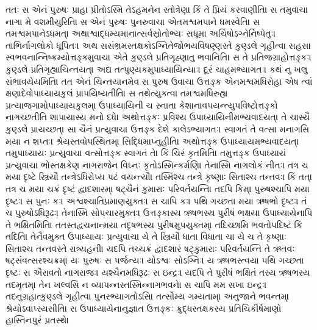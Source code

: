 \documentclass[a4paper,12pt]{article}
\begin{document}
તતઃ સ એનં પુરુષઃ પ્રાહ। પ્રીતોઽસ્મિ તેઽહમનેન સ્તોત્રેણ। કિં તે પ્રિયં કરવાણીતિ।
સ તમુવાચ। નાગા મે વશમીયુરિતિ।
સ એનં પુરુષઃ પુનરુવાચ। એતમશ્વમપાને ધમસ્વેતિ।
સ તમશ્વમપાનેઽધમત્। અથાશ્વાદ્ધમ્યમાનાત્સર્વસ્રોતોભ્યઃ સધૂમા અર્ચિષોઽગ્નેર્નિષ્પેતુઃ।
તાભિર્નાગલોકો ધૂપિતઃ।
અથ સસંભ્રમસ્તક્ષકોઽગ્નિતેજોભયવિષણ્ણસ્તે કુણ્ડલે ગૃહીત્વા સહસા સ્વભવનાન્નિષ્ક્રમ્યોત્તઙ્કમુવાચ। એતે કુણ્ડલે પ્રતિગૃહ્ણાતુ ભવાનિતિ।
સ તે પ્રતિજગ્રાહોત્તઙ્કઃ। કુણ્ડલે પ્રતિગૃહ્યાચિન્તયત્। અદ્ય તત્પુણ્યકમુપાધ્યાયિન્યાઃ। દૂરં ચાહમભ્યાગતઃ। કથં નુ ખલુ સંભાવયેયમિતિ।
તત એનં ચિન્તયાનમેવ સ પુરુષ ઉવાચ। ઉત્તઙ્ક એનમશ્વમધિરોહ। એષ ત્વાં ક્ષણાદેવોપાધ્યાયકુલં પ્રાપયિષ્યતીતિ।
સ તથેત્યુક્ત્વા તમશ્વમધિરુહ્ય પ્રત્યાજગામોપાધ્યાયકુલમ્। ઉપાધ્યાયિની ચ સ્નાતા કેશાનાવપયન્ત્યુપવિષ્ટોત્તઙ્કો નાગચ્છતીતિ શાપાયાસ્ય મનો દધે।
અથોત્તઙ્કઃ પ્રવિશ્ય ઉપાધ્યાયિનીમભ્યવાદયત્। તે ચાસ્યૈ કુણ્ડલે પ્રાયચ્છત્।
સા ચૈનં પ્રત્યુવાચ। ઉત્તઙ્ક દેશે કાલેઽભ્યાગતઃ। સ્વાગતં તે વત્સ। મનાગસિ મયા ન શપ્તઃ। શ્રેયસ્તવોપસ્થિતમ્। સિદ્ધિમાપ્નુહીતિ।
અથોત્તઙ્ક ઉપાધ્યાયમભ્યવાદયત્। તમુપાધ્યાયઃ પ્રત્યુવાચ। વત્સોત્તઙ્ક સ્વાગતં તે। કિં ચિરં કૃતમિતિ।
તમુત્તઙ્ક ઉપાધ્યાયં પ્રત્યુવાચ। ભોસ્તક્ષકેણ નાગરાજેન વિઘ્નઃ કૃતોઽસ્મિન્કર્મણિ। તેનાસ્મિ નાગલોકં નીતઃ।
તત્ર ચ મયા દૃષ્ટે સ્ત્રિયૌ તન્ત્રેઽધિરોપ્ય પટં વયન્ત્યૌ। તસ્મિંશ્ચ તન્ત્રે કૃષ્ણાઃ સિતાશ્ચ તન્તવઃ। કિં તત્।
તત્ર ચ મયા ચક્રં દૃષ્ટં દ્વાદશારમ્। ષટ્ચૈનં કુમારાઃ પરિવર્તયન્તિ। તદપિ કિમ્।
પુરુષશ્ચાપિ મયા દૃષ્ટઃ। સ પુનઃ કઃ।
અશ્વશ્ચાતિપ્રમાણયુક્તઃ। સ ચાપિ કઃ।
પથિ ગચ્છતા મયા ઋષભો દૃષ્ટઃ। તં ચ પુરુષોઽધિરૂઢઃ। તેનાસ્મિ સોપચારમુક્તઃ। ઉત્તઙ્કાસ્ય ઋષભસ્ય પુરીષં ભક્ષય। ઉપાધ્યાયેનાપિ તે ભક્ષિતમિતિ। તતસ્તદ્વચનાન્મયા તદૃષભસ્ય પુરીષમુપયુક્તમ્। તદિચ્છામિ ભવતોપદિષ્ટં કિં તદિતિ।
તેનૈવમુક્ત ઉપાધ્યાયઃ પ્રત્યુવાચ। યે તે સ્ત્રિયૌ ધાતા વિધાતા ચ। યે ચ તે કૃષ્ણાઃ સિતાશ્ચ તન્તવસ્તે રાત્ર્યહની।
યદપિ તચ્ચક્રં દ્વાદશારં ષટ્કુમારાઃ પરિવર્તયન્તિ તે ઋતવઃ ષટ્સંવત્સરશ્ચક્રમ્। યઃ પુરુષઃ સ પર્જન્યઃ। યોઽશ્વઃ સોઽગ્નિઃ।
ય ઋષભસ્ત્વયા પથિ ગચ્છતા દૃષ્ટઃ સ ઐરાવતો નાગરાજઃ। યશ્ચૈનમધિરૂઢઃ સ ઇન્દ્રઃ। યદપિ તે પુરીષં ભક્ષિતં તસ્ય ઋષભસ્ય તદમૃતમ્।
તેન ખલ્વસિ ન વ્યાપન્નસ્તસ્મિન્નાગભવને। સ ચાપિ મમ સખા ઇન્દ્રઃ।
તદનુગ્રહાત્કુણ્ડલે ગૃહીત્વા પુનરભ્યાગતોઽસિ। તત્સૌમ્ય ગમ્યતામ્। અનુજાને ભવન્તમ્। શ્રેયોઽવાપ્સ્યસીતિ।
સ ઉપાધ્યાયેનાનુજ્ઞાત ઉત્તઙ્કઃ ક્રુદ્ધસ્તક્ષકસ્ય પ્રતિચિકીર્ષમાણો હાસ્તિનપુરં પ્રતસ્થે।
\end{document}
